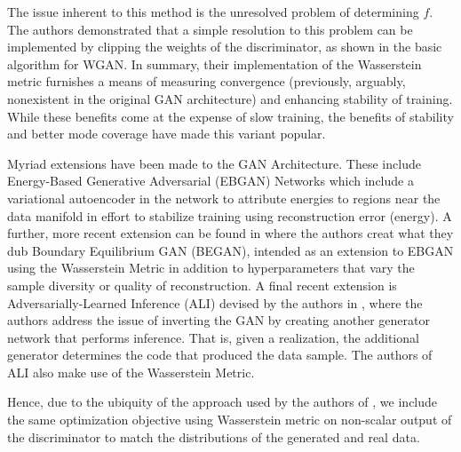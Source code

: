 \documentclass{article}
\begin{document}
    The issue inherent to this method is the unresolved problem of determining $f$.  The authors demonstrated that a simple resolution to this problem can be implemented by clipping the weights of the discriminator, as shown in the basic algorithm for WGAN. In summary, their implementation of the Wasserstein metric furnishes a means of measuring convergence (previously, arguably, nonexistent in the original GAN architecture) and enhancing stability of training.  While these benefits come at the expense of slow training, the benefits of stability and better mode coverage have made this variant popular.
    
	Myriad extensions have been made to the GAN Architecture.  These include Energy-Based Generative Adversarial (EBGAN) Networks 
    \cite{Zhao2016Energy-basedNetwork} which include a variational autoencoder in the network to attribute energies to regions near the data manifold in effort to stabilize training using reconstruction error (energy).  A further, more recent extension can be found in \cite{Berthelot2017BEGAN:Networks} where the authors creat what they dub Boundary Equilibrium GAN (BEGAN), intended as an extension to EBGAN using the Wasserstein Metric in addition to hyperparameters that vary the sample diversity or quality of reconstruction.  A final recent extension is Adversarially-Learned Inference (ALI) devised by the authors in \cite{Dumoulin2016AdversariallyInference}, where the authors address the issue of inverting the GAN by creating another generator network that performs inference.  That is, given a realization, the additional generator determines the code that produced the data sample.  The authors of ALI also make use of the Wasserstein Metric.

	Hence, due to the ubiquity of the approach used by the authors of \cite{Arjovsky2017WassersteinGAN}, we include the same optimization objective using Wasserstein metric on non-scalar output of the discriminator to match the distributions of the generated and real data. 
\end{document}
